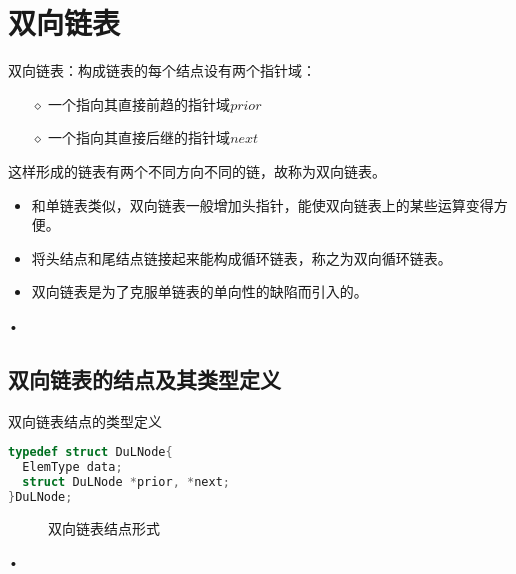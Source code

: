 \section{双向链表}

\begin{frame}
双向链表：构成链表的每个结点设有两个指针域：
\begin{itemize}
\item[$\diamond$]
一个指向其直接前趋的指针域$prior$
\item[$\diamond$]
一个指向其直接后继的指针域$next$
\end{itemize}
这样形成的链表有两个不同方向不同的链，故称为双向链表。


\begin{itemize}
\item 和单链表类似，双向链表一般增加头指针，能使双向链表上的某些运算变得方便。
\item
将头结点和尾结点链接起来能构成循环链表，称之为双向循环链表。
\item
双向链表是为了克服单链表的单向性的缺陷而引入的。
\end{itemize}•
\end{frame}


\subsection{双向链表的结点及其类型定义}
\begin{frame}[fragile]\ft{\subsecname}
\begin{block}{双向链表结点的类型定义}
\begin{lstlisting}[language=C]
typedef struct DuLNode{
  ElemType data;
  struct DuLNode *prior, *next;
}DuLNode;
\end{lstlisting}
\end{block}

\begin{figure}
\caption{双向链表结点形式}
\end{figure}•
\end{frame}



